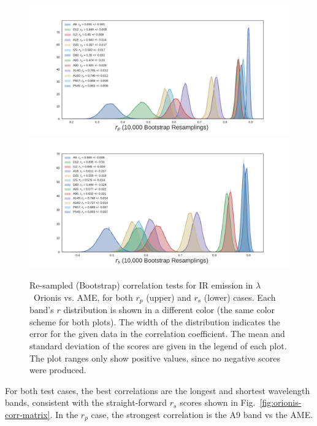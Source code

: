             \begin{figure}
              \includegraphics[width=\textwidth,trim={3cm 0.25cm 2.5cm 1cm},clip]{../Plots/ch_lori/bootstrap_vs_AME_pearson_i10000.pdf}
              \includegraphics[width=\textwidth,trim={3cm 0.25cm 2.5cm 1cm},clip]{../Plots/ch_lori/bootstrap_vs_AME_spearman_i10000.pdf}
              \centering
              \caption{Re-sampled (Bootstrap) correlation tests for IR emission in $\lambda$~Orionis vs. AME, for both $r_{p}$ (upper) and $r_{s}$ (lower) cases. Each band's $r$ distribution is shown in a different color (the same color scheme for both plots). The width of the distribution indicates the error for the given data in the correlation coefficient. The mean and standard deviation of the scores are given in the legend of each plot. The plot ranges only show positive values, since no negative scores were produced. }
              \label{fig:bootstrap_vs_AME}
            \end{figure}
        For both test cases, the best correlations are the longest and shortest wavelength bands, consistent with the straight-forward $r_{s}$ scores shown in Fig.~\ref{fig:orionis-corr-matrix}. In the $r_{p}$ case, the strongest correlation is the A9 band vs the AME.

